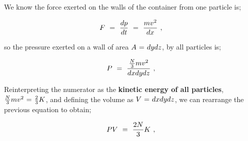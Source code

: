 \documentclass{article}
\begin{document}
We know the force exerted on the walls of the container from one particle is;

\begin{equation} \label{eb-eq-256-66}
F \hspace{0.125cm} = \hspace{0.125cm} \frac{d p}{d t} \hspace{0.125cm} = \hspace{0.125cm} \frac{m v^2}{d x} \hspace{0.125cm} ,
\end{equation}

so the pressure exerted on a wall of area \begin{math} A \hspace{0.025cm} = \hspace{0.025cm} dy dz \end{math}, by all particles is;

\begin{equation} \label{eb-eq-256-67}
P \hspace{0.125cm} = \hspace{0.125cm} \frac{\frac{N}{3} m v^2}{d x dy dz} \hspace{0.125cm} ,
\end{equation}

Reinterpreting the numerator as the \textbf{kinetic energy of all particles}, \begin{math} \frac{N}{3} m v^2 \hspace{0.025cm} = \hspace{0.025cm} \frac{2}{3} K \end{math}, and defining the volume as \begin{math} V \hspace{0.025cm} = \hspace{0.025cm} dx dy dz \end{math}, we can rearrange the previous equation to obtain;

\begin{equation} \label{eb-eq-256-68}
P V \hspace{0.125cm} = \hspace{0.125cm} \frac{2N}{3} K \hspace{0.125cm} ,
\end{equation}
\end{document}
